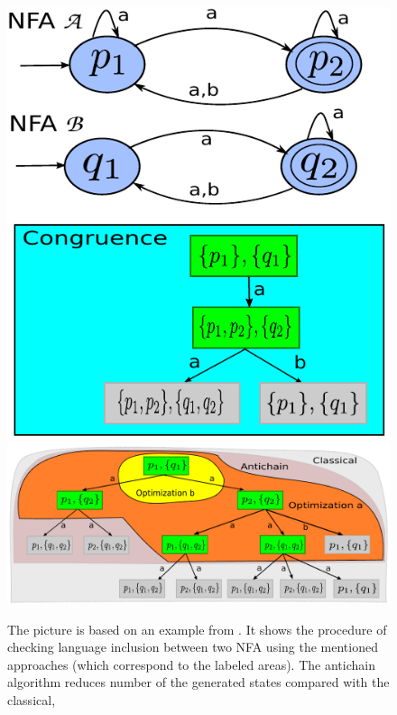 \begin{figure}[bht]
\begin{center}
	\scalebox{1}
	{
		\includegraphics[scale=0.5]{fig/congr1.pdf}
		\hspace{0.55cm}
  	\includegraphics[scale=0.5]{fig/ac1.pdf}
	}
  \caption{
      \rm{
      \hspace{0.1cm} The picture is based on an example from \cite{tacas10}.
      It shows the procedure of checking language inclusion between two NFA using the mentioned approaches (which correspond to the labeled areas).
      The antichain algorithm reduces number of the generated states compared with the classical,
}}
\end{center}
\end{figure}
